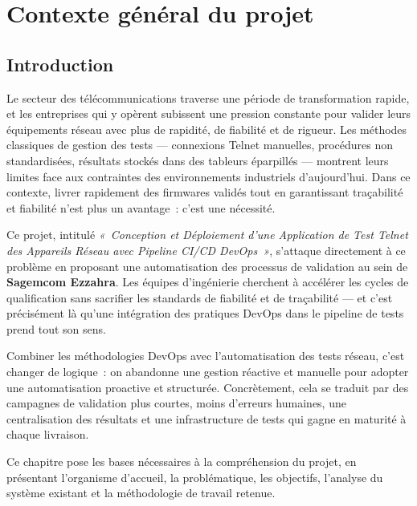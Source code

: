 \chapter{Contexte général du projet}

\section{Introduction}

Le secteur des télécommunications traverse une période de transformation
rapide, et les entreprises qui y opèrent subissent une pression constante
pour valider leurs équipements réseau avec plus de rapidité, de fiabilité
et de rigueur. Les méthodes classiques de gestion des tests --- connexions
Telnet manuelles, procédures non standardisées, résultats stockés dans des
tableurs éparpillés --- montrent leurs limites face aux contraintes des
environnements industriels d'aujourd'hui. Dans ce contexte, livrer
rapidement des firmwares validés tout en garantissant traçabilité et
fiabilité n'est plus un avantage~: c'est une nécessité.

Ce projet, intitulé \textit{«~Conception et Déploiement d'une Application
de Test Telnet des Appareils Réseau avec Pipeline CI/CD DevOps~»},
s'attaque directement à ce problème en proposant une automatisation des
processus de validation au sein de \textbf{Sagemcom Ezzahra}. Les équipes
d'ingénierie cherchent à accélérer les cycles de qualification sans
sacrifier les standards de fiabilité et de traçabilité --- et c'est
précisément là qu'une intégration des pratiques DevOps dans le pipeline
de tests prend tout son sens.

Combiner les méthodologies DevOps avec l'automatisation des tests réseau,
c'est changer de logique~: on abandonne une gestion réactive et manuelle
pour adopter une automatisation proactive et structurée. Concrètement,
cela se traduit par des campagnes de validation plus courtes, moins
d'erreurs humaines, une centralisation des résultats et une infrastructure
de tests qui gagne en maturité à chaque livraison.

Ce chapitre pose les bases nécessaires à la compréhension du projet, en
présentant l'organisme d'accueil, la problématique, les objectifs,
l'analyse du système existant et la méthodologie de travail retenue.


